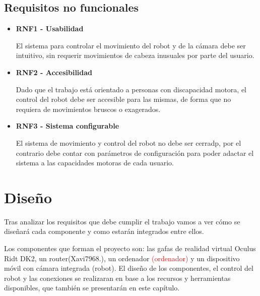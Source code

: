 \documentclass[twoside, 11pt]{epstfg}
\begin{document}
\section{Requisitos no funcionales}

\begin{itemize}
	\item \textbf{RNF1 - Usabilidad}
	
	
	El sistema para controlar el movimiento del robot y de la cámara debe ser intuitivo, sin requerir movimientos de cabeza inusuales por parte del usuario.
	
	
	
	\item \textbf{RNF2 - Accesibilidad}
	
	Dado que el trabajo está orientado a personas con discapacidad motora, el control del robot debe ser accesible para las mismas, de forma que no requiera de movimientos bruscos o exagerados. 
	
	\item \textbf{RNF3 - Sistema configurable}
	
	El sistema de movimiento y control del robot no debe ser cerradp, por el contrario debe contar con parámetros de configuración para poder adactar el sistema a las capacidades motoras de cada usuario.
\end{itemize}

\newpage
\chapter{Diseño}

Tras analizar los requisitos que debe cumplir el trabajo vamos a ver cómo se diseñará cada componente y como estarán integrados entre ellos.

Los componentes que forman el proyecto son: las gafas de realidad virtual Oculus Ridt DK2, un router(Xavi7968.), un ordenador \textcolor{red}{(ordenador)} y un dispositivo móvil con cámara integrada (robot).
El diseño de los componentes, el control del robot y las conexiones se realizaran en base a los recursos y herramientas disponibles, que también se presentarán en este capítulo.
\end{document}
